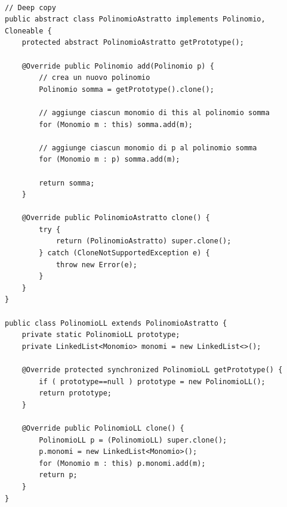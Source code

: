 \begin{verbatim}

// Deep copy
public abstract class PolinomioAstratto implements Polinomio, Cloneable { 
    protected abstract PolinomioAstratto getPrototype(); 

    @Override public Polinomio add(Polinomio p) { 
        // crea un nuovo polinomio 
        Polinomio somma = getPrototype().clone(); 

        // aggiunge ciascun monomio di this al polinomio somma 
        for (Monomio m : this) somma.add(m); 
        
        // aggiunge ciascun monomio di p al polinomio somma 
        for (Monomio m : p) somma.add(m); 
        
        return somma; 
    } 
    
    @Override public PolinomioAstratto clone() { 
        try { 
            return (PolinomioAstratto) super.clone(); 
        } catch (CloneNotSupportedException e) { 
            throw new Error(e); 
        }
    }
}

public class PolinomioLL extends PolinomioAstratto { 
    private static PolinomioLL prototype; 
    private LinkedList<Monomio> monomi = new LinkedList<>(); 
    
    @Override protected synchronized PolinomioLL getPrototype() { 
        if ( prototype==null ) prototype = new PolinomioLL(); 
        return prototype;
    } 
    
    @Override public PolinomioLL clone() {
        PolinomioLL p = (PolinomioLL) super.clone();
        p.monomi = new LinkedList<Monomio>(); 
        for (Monomio m : this) p.monomi.add(m); 
        return p;
    }
}

\end{verbatim}

\newpage